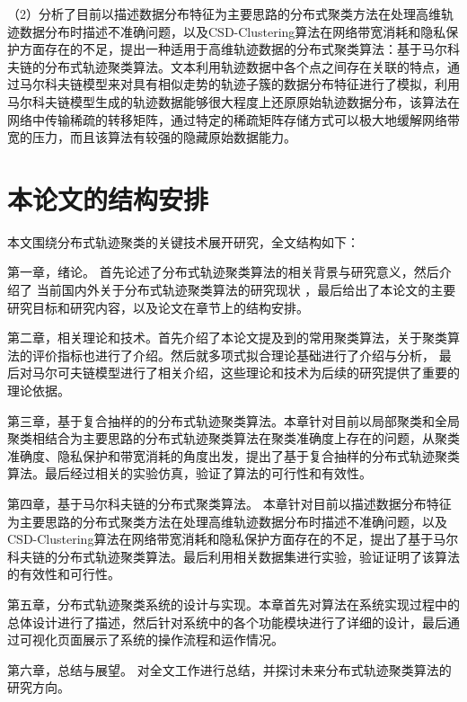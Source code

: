 （2）分析了目前以描述数据分布特征为主要思路的分布式聚类方法在处理高维轨迹数据分布时描述不准确问题，以及CSD-Clustering算法在网络带宽消耗和隐私保护方面存在的不足，提出一种适用于高维轨迹数据的分布式聚类算法：基于马尔科夫链的分布式轨迹聚类算法。文本利用轨迹数据中各个点之间存在关联的特点，通过马尔科夫链模型来对具有相似走势的轨迹子簇的数据分布特征进行了模拟，利用马尔科夫链模型生成的轨迹数据能够很大程度上还原原始轨迹数据分布，该算法在网络中传输稀疏的转移矩阵，通过特定的稀疏矩阵存储方式可以极大地缓解网络带宽的压力，而且该算法有较强的隐藏原始数据能力。


\section{本论文的结构安排}

本文围绕分布式轨迹聚类的关键技术展开研究，全文结构如下：

第一章，绪论。 首先论述了分布式轨迹聚类算法的相关背景与研究意义，然后介绍了 当前国内外关于分布式轨迹聚类算法的研究现状 ，最后给出了本论文的主要研究目标和研究内容，以及论文在章节上的结构安排。

第二章，相关理论和技术。首先介绍了本论文提及到的常用聚类算法，关于聚类算法的评价指标也进行了介绍。然后就多项式拟合理论基础进行了介绍与分析， 最后对马尔可夫链模型进行了相关介绍，这些理论和技术为后续的研究提供了重要的理论依据。

第三章，基于复合抽样的的分布式轨迹聚类算法。本章针对目前以局部聚类和全局聚类相结合为主要思路的分布式轨迹聚类算法在聚类准确度上存在的问题，从聚类准确度、隐私保护和带宽消耗的角度出发，提出了基于复合抽样的分布式轨迹聚类算法。最后经过相关的实验仿真，验证了算法的可行性和有效性。

第四章，基于马尔科夫链的分布式聚类算法。 本章针对目前以描述数据分布特征为主要思路的分布式聚类方法在处理高维轨迹数据分布时描述不准确问题，以及CSD-Clustering算法在网络带宽消耗和隐私保护方面存在的不足，提出了基于马尔科夫链的分布式轨迹聚类算法。最后利用相关数据集进行实验，验证证明了该算法的有效性和可行性。

第五章，分布式轨迹聚类系统的设计与实现。本章首先对算法在系统实现过程中的总体设计进行了描述，然后针对系统中的各个功能模块进行了详细的设计，最后通过可视化页面展示了系统的操作流程和运作情况。

第六章，总结与展望。 对全文工作进行总结，并探讨未来分布式轨迹聚类算法的研究方向。